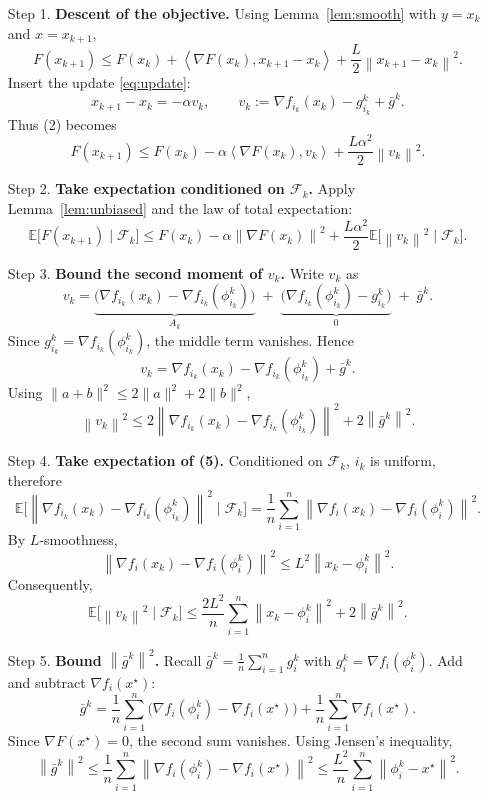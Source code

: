 \documentclass{article}
\newcommand{\E}{\mathbb{E}}
\newcommand{\norm}[1]{\left\lVert#1\right\rVert}
\newcommand{\inner}[2]{\left\langle #1,#2\right\rangle}
\begin{document}
\begin{enumerate}
\item[Step 1.] \textbf{Descent of the objective.}  
Using Lemma~\ref{lem:smooth} with $y=x_k$ and $x=x_{k+1}$,
\[
F(x_{k+1})\le F(x_k)+\inner{\nabla F(x_k)}{x_{k+1}-x_k}
      +\frac{L}{2}\norm{x_{k+1}-x_k}^{2}. \tag{2}
\]
Insert the update \eqref{eq:update}:
\[
x_{k+1}-x_k = -\alpha v_k,\qquad v_k:=\nabla f_{i_k}(x_k)-g_{i_k}^{k}+\bar g^{k}.
\]
Thus (2) becomes
\[
F(x_{k+1})\le F(x_k)-\alpha\inner{\nabla F(x_k)}{v_k}
               +\frac{L\alpha^{2}}{2}\norm{v_k}^{2}. \tag{3}
\]

\item[Step 2.] \textbf{Take expectation conditioned on $\mathcal{F}_k$.}  
Apply Lemma~\ref{lem:unbiased} and the law of total expectation:
\[
\E\!\bigl[F(x_{k+1})\mid\mathcal{F}_k\bigr]
\le F(x_k)-\alpha\norm{\nabla F(x_k)}^{2}
   +\frac{L\alpha^{2}}{2}\E\!\bigl[\norm{v_k}^{2}\mid\mathcal{F}_k\bigr]. \tag{4}
\]

\item[Step 3.] \textbf{Bound the second moment of $v_k$.}  
Write $v_k$ as
\[
v_k = \underbrace{\bigl(\nabla f_{i_k}(x_k)-\nabla f_{i_k}(\phi_{i_k}^{k})\bigr)}_{A_k}
      \;+\;\underbrace{\bigl(\nabla f_{i_k}(\phi_{i_k}^{k})-g_{i_k}^{k}\bigr)}_{0}
      \;+\;\bar g^{k}.
\]
Since $g_{i_k}^{k}= \nabla f_{i_k}(\phi_{i_k}^{k})$, the middle term vanishes. Hence
\[
v_k = \nabla f_{i_k}(x_k)-\nabla f_{i_k}(\phi_{i_k}^{k})+\bar g^{k}.
\]
Using $\|a+b\|^{2}\le 2\|a\|^{2}+2\|b\|^{2}$,
\[
\norm{v_k}^{2}\le 2\norm{\nabla f_{i_k}(x_k)-\nabla f_{i_k}(\phi_{i_k}^{k})}^{2}
               +2\norm{\bar g^{k}}^{2}. \tag{5}
\]

\item[Step 4.] \textbf{Take expectation of (5).}  
Conditioned on $\mathcal{F}_k$, $i_k$ is uniform, therefore
\[
\E\!\bigl[\norm{\nabla f_{i_k}(x_k)-\nabla f_{i_k}(\phi_{i_k}^{k})}^{2}\mid\mathcal{F}_k\bigr]
= \frac{1}{n}\sum_{i=1}^{n}\norm{\nabla f_i(x_k)-\nabla f_i(\phi_i^{k})}^{2}.
\]
By $L$‑smoothness,
\[
\norm{\nabla f_i(x_k)-\nabla f_i(\phi_i^{k})}^{2}\le L^{2}\norm{x_k-\phi_i^{k}}^{2}.
\]
Consequently,
\[
\E\!\bigl[\norm{v_k}^{2}\mid\mathcal{F}_k\bigr]
\le \frac{2L^{2}}{n}\sum_{i=1}^{n}\norm{x_k-\phi_i^{k}}^{2}
    +2\norm{\bar g^{k}}^{2}. \tag{6}
\]

\item[Step 5.] \textbf{Bound $\norm{\bar g^{k}}^{2}$.}  
Recall $\bar g^{k}= \frac{1}{n}\sum_{i=1}^{n}g_i^{k}$ with $g_i^{k}= \nabla f_i(\phi_i^{k})$.
Add and subtract $\nabla f_i(x^{\star})$:
\[
\bar g^{k}= \frac{1}{n}\sum_{i=1}^{n}\bigl(\nabla f_i(\phi_i^{k})-\nabla f_i(x^{\star})\bigr)
           +\frac{1}{n}\sum_{i=1}^{n}\nabla f_i(x^{\star}).
\]
Since $\nabla F(x^{\star})=0$, the second sum vanishes. Using Jensen's inequality,
\[
\norm{\bar g^{k}}^{2}
\le \frac{1}{n}\sum_{i=1}^{n}\norm{\nabla f_i(\phi_i^{k})-\nabla f_i(x^{\star})}^{2}
\le \frac{L^{2}}{n}\sum_{i=1}^{n}\norm{\phi_i^{k}-x^{\star}}^{2}. \tag{7}
\]


\end{enumerate}
\end{document}
